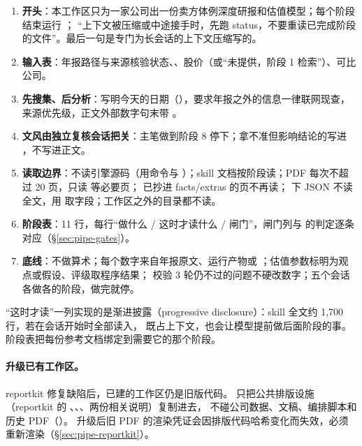 \begin{enumerate}
  \item \textbf{开头}：本工作区只为一家公司出一份卖方体例深度研报和估值模型；每个阶段结束运行 ；
        “上下文被压缩或中途接手时，先跑 status，不要重读已完成阶段的文件”。最后一句是专门为长会话的上下文压缩写的。
  \item \textbf{输入表}：年报路径与来源核验状态、、股价（或“未提供，阶段 1 检索”）、可比公司。
  \item \textbf{先搜集、后分析}：写明今天的日期（），要求年报之外的信息一律联网现查，来源优先级，正文外部数字句末带 \code{[S编号]}。
  \item \textbf{文风由独立复核会话把关}：主笔做到阶段 8 停下；拿不准但影响结论的写进 ，不写进正文。
  \item \textbf{读取边界}：不读引擎源码（用命令与 ）；skill 文档按阶段读；PDF 每次不超过 20 页，只读  等必要页；
        已抄进 facts/extras 的页不再读； 下 JSON 不读全文，用  取字段；工作区之外的目录都不读。
  \item \textbf{阶段表}：11 行，每行“做什么 / 这时才读什么 / 闸门”，闸门列与  的判定逐条对应（\S\ref{sec:pipe-gates}）。
  \item \textbf{底线}：不做算术；每个数字来自年报原文、运行产物或 ；估值参数标明为观点或假设、评级取程序结果；
        校验 3 轮仍不过的问题不硬改数字；五个会话各做各的阶段，做完就停。
\end{enumerate}

“这时才读”一列实现的是渐进披露（progressive disclosure）：skill 全文约 1,700 行，若在会话开始时全部读入，
既占上下文，也会让模型提前做后面阶段的事。阶段表把每份参考文档绑定到需要它的那个阶段。

\paragraph{升级已有工作区。}reportkit 修复缺陷后，已建的工作区仍是旧版代码。
只把公共排版设施（reportkit 的 、、、两份相关说明）复制进去，
不碰公司数据、文稿、编排脚本和历史 PDF（）。
升级后旧 PDF 的渲染凭证会因排版代码哈希变化而失效，必须重新渲染（\S\ref{sec:pipe-reportkit}）。

